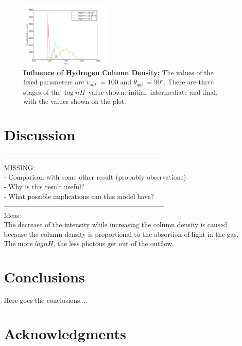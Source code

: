 \documentclass{emulateapj}
\newcommand{\kms}{{\ifmmode{{\mathrm{\,km\ s}^{-1}}}\else{\,km~s$^{-1}$}\fi}}
\newcommand{\ang}{{$\theta_{gal}$~}}
\newcommand{\lognh}{{$\log{nH}$~}}
\newcommand{\vel}{{$v_{out}$~}}
\begin{document}
\begin{figure}
\begin{center}
  \includegraphics[width=0.4\textwidth]{./figures/influence_lognH.png}
\end{center}
\caption{\textbf{Influence of Hydrogen Column Density:} The values of the fixed parameters are \vel = 100 \kms and \ang = 90$^\circ$. There are three stages of the \lognh value shown: initial, intermediate and final, with the values shown on the plot.
\label{fig:influence_lognH}}  
\end{figure}



\section{Discussion}
\label{sec:discussion}

---------------------------------------------------------------------\\
MISSING: \\
- Comparison with some other result (probably observations).\\
- Why is this result useful? \\
- What possible implications can this model have?\\
-----------------------------------------------------------------------\\

Ideas: \\

The decrease of the intensity while increasing the column density is caused because the column density is proportional to the absortion of light in the gas. The more $log{nH}$, the less photons get out of the outflow. 

\section{Conclusions}
\label{sec:conclusions}
Here goes the conclusions....

\section*{Acknowledgments}
\end{document}
